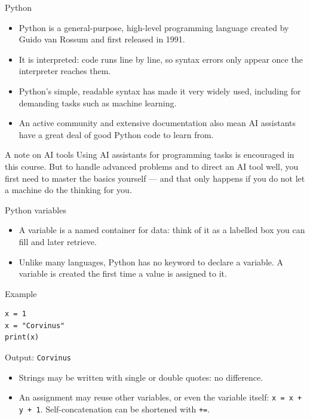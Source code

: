 \documentclass[aspectratio=169,11pt]{beamer}
\begin{document}
\begin{frame}{Python}
  \begin{itemize}
    \item Python is a general-purpose, high-level programming language created
          by Guido van Rossum and first released in 1991.
    \item It is interpreted: code runs line by line, so syntax errors only
          appear once the interpreter reaches them.
    \item Python's simple, readable syntax has made it very widely used,
          including for demanding tasks such as machine learning.
    \item An active community and extensive documentation also mean AI
          assistants have a great deal of good Python code to learn from.
  \end{itemize}
  \begin{block}{A note on AI tools}
    Using AI assistants for programming tasks is encouraged in this course.
    But to handle advanced problems and to direct an AI tool well, you first
    need to master the basics yourself --- and that only happens if you do not
    let a machine do the thinking for you.
  \end{block}
\end{frame}


\begin{frame}[fragile]{Python variables}
  \begin{itemize}
    \item A variable is a named container for data: think of it as a labelled
          box you can fill and later retrieve.
    \item Unlike many languages, Python has no keyword to declare a variable.
          A variable is created the first time a value is assigned to it.
  \end{itemize}
  \begin{block}{Example}
\begin{verbatim}
x = 1
x = "Corvinus"
print(x)
\end{verbatim}
    Output: \texttt{Corvinus}
  \end{block}
  \begin{itemize}
    \item Strings may be written with single or double quotes: no difference.
    \item An assignment may reuse other variables, or even the variable itself:
          \texttt{x = x + y + 1}. Self-concatenation can be shortened with
          \texttt{+=}.
  \end{itemize}
\end{frame}
\end{document}
